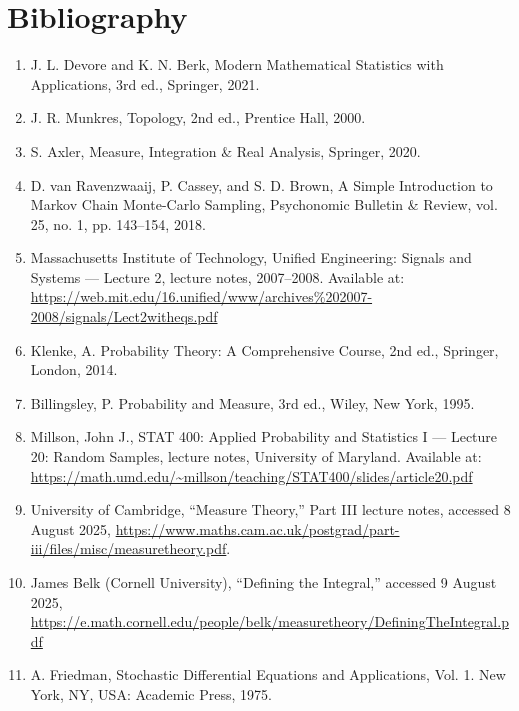 \documentclass{article}
\begin{document}
\newpage
\section*{Bibliography}
\begin{enumerate}
    \item J. L. Devore and K. N. Berk, Modern Mathematical Statistics with Applications, 3rd ed., Springer, 2021.
    \item J. R. Munkres, Topology, 2nd ed., Prentice Hall, 2000.
    \item S. Axler, Measure, Integration \& Real Analysis, Springer, 2020.
    \item D. van Ravenzwaaij, P. Cassey, and S. D. Brown, A Simple Introduction to Markov Chain Monte-Carlo Sampling, Psychonomic Bulletin \& Review, vol. 25, no. 1, pp. 143--154, 2018.
    \item Massachusetts Institute of Technology, Unified Engineering: Signals and Systems — Lecture 2, lecture notes, 2007–2008. Available at: \url{https://web.mit.edu/16.unified/www/archives%202007-2008/signals/Lect2witheqs.pdf}
    \item Klenke, A. Probability Theory: A Comprehensive Course, 2nd ed., Springer, London, 2014.
    \item Billingsley, P. Probability and Measure, 3rd ed., Wiley, New York, 1995.
    \item Millson, John J., STAT 400: Applied Probability and Statistics I — Lecture 20: Random Samples, lecture notes, University of Maryland. Available at: \url{https://math.umd.edu/~millson/teaching/STAT400/slides/article20.pdf}
    \item University of Cambridge, “Measure Theory,” Part III lecture notes, accessed 8 August 2025, \url{https://www.maths.cam.ac.uk/postgrad/part-iii/files/misc/measuretheory.pdf}.
    \item James Belk (Cornell University), “Defining the Integral,” accessed 9 August 2025, \url{https://e.math.cornell.edu/people/belk/measuretheory/DefiningTheIntegral.pdf}
    \item A. Friedman, Stochastic Differential Equations and Applications, Vol. 1. New York, NY, USA: Academic Press, 1975.
\end{enumerate}
\end{document}
